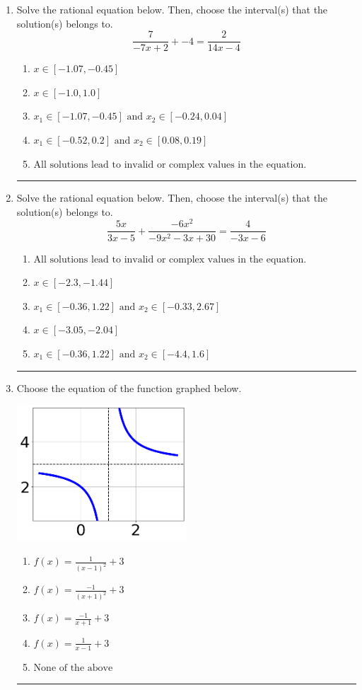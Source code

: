 \documentclass[14pt]{extbook}
\newcommand{\litem}[1]{\item#1\hspace*{-1cm}\rule{\textwidth}{0.4pt}}
\begin{document}
\begin{enumerate}
{\begin{enumerate}[label=\Alph*.]
\end{enumerate} }
\litem{
Solve the rational equation below. Then, choose the interval(s) that the solution(s) belongs to.\[ \frac{7}{-7x + 2} + -4 = \frac{2}{14x -4} \]\begin{enumerate}[label=\Alph*.]
\item \( x \in [-1.07,-0.45] \)
\item \( x \in [-1.0,1.0] \)
\item \( x_1 \in [-1.07, -0.45] \text{ and } x_2 \in [-0.24,0.04] \)
\item \( x_1 \in [-0.52, 0.2] \text{ and } x_2 \in [0.08,0.19] \)
\item \( \text{All solutions lead to invalid or complex values in the equation.} \)

\end{enumerate} }
\litem{
Solve the rational equation below. Then, choose the interval(s) that the solution(s) belongs to.\[ \frac{5x}{3x -5} + \frac{-6x^{2}}{-9x^{2} -3 x + 30} = \frac{4}{-3x -6} \]\begin{enumerate}[label=\Alph*.]
\item \( \text{All solutions lead to invalid or complex values in the equation.} \)
\item \( x \in [-2.3,-1.44] \)
\item \( x_1 \in [-0.36, 1.22] \text{ and } x_2 \in [-0.33,2.67] \)
\item \( x \in [-3.05,-2.04] \)
\item \( x_1 \in [-0.36, 1.22] \text{ and } x_2 \in [-4.4,1.6] \)

\end{enumerate} }
\litem{
Choose the equation of the function graphed below.
\begin{center}
    \includegraphics[width=0.5\textwidth]{../Figures/rationalGraphToEquationA.png}
\end{center}
\begin{enumerate}[label=\Alph*.]
\item \( f(x) = \frac{1}{(x - 1)^2} + 3 \)
\item \( f(x) = \frac{-1}{(x + 1)^2} + 3 \)
\item \( f(x) = \frac{-1}{x + 1} + 3 \)
\item \( f(x) = \frac{1}{x - 1} + 3 \)
\item \( \text{None of the above} \)

\end{enumerate} }
\end{enumerate}
\end{document}
